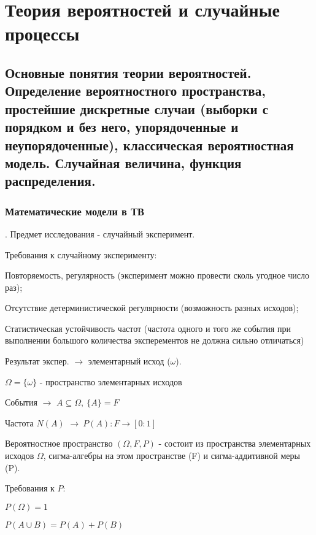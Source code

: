 \chapter{Теория вероятностей и случайные\\\hfill процессы}

\begin{multicols}{2}
    \raggedcolumns 
    \section{Основные понятия теории вероятностей. Определение вероятностного пространства,
    простейшие дискретные случаи (выборки с порядком и без него, упорядоченные и
    неупорядоченные), классическая вероятностная модель. Случайная величина, функция
    распределения.}
    \subsection*{Математические модели в ТВ}. 
    Предмет исследования - случайный эксперимент.
    
    \begin{note}
    Требования к случайному эксперименту:
    \begin{enumerate*}
        \item Повторяемость, регулярность (эксперимент можно провести сколь угодное число раз);
        \item Отсутствие детерминистической регулярности (возможность разных исходов);
        \item Статистическая устойчивость частот (частота одного и того же события при выполнении большого количества эксперементов не должна сильно отличаться)
    \end{enumerate*}
    \end{note}
    Результат экспер. $\to$ элементарный исход ($\omega$).
    \par
    $\Omega = \{\omega\}$ - пространство элементарных исходов \
    \par
    События $\to$ $A \subseteq \Omega,\  \{A\}= F$ 
    \par
    Частота $N(A)$ $\to \ P(A): F \to [0:1]$
    \par
    Вероятностное пространство $(\Omega, F, P)$ - состоит из пространства элементарных исходов $\Omega$, сигма-алгебры на этом пространстве (F) и сигма-аддитивной меры (P).
    \begin{note}
    Требования к $P$:
    \begin{enumerate*}
    \item $P(\Omega) = 1$
    \item $P(A\cup B) = P(A) + P(B)$
    \end{enumerate*}
    \end{note}

\end{multicols}
